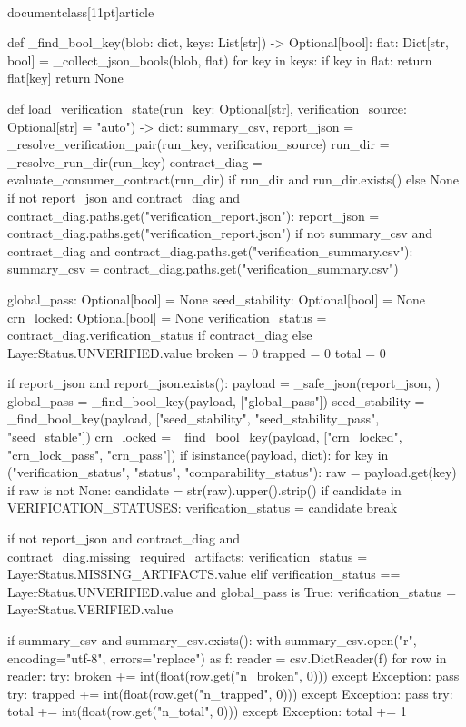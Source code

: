 \\documentclass[11pt]{article}
\begin{document}
\begin{CodeBlock}
{def _find_bool_key(blob: dict, keys: List[str]) -> Optional[bool]:
    flat: Dict[str, bool] = {}
    _collect_json_bools(blob, flat)
    for key in keys:
        if key in flat:
            return flat[key]
    return None


def load_verification_state(run_key: Optional[str], verification_source: Optional[str] = "auto") -> dict:
    summary_csv, report_json = _resolve_verification_pair(run_key, verification_source)
    run_dir = _resolve_run_dir(run_key)
    contract_diag = evaluate_consumer_contract(run_dir) if run_dir and run_dir.exists() else None
    if not report_json and contract_diag and contract_diag.paths.get("verification_report.json"):
        report_json = contract_diag.paths.get("verification_report.json")
    if not summary_csv and contract_diag and contract_diag.paths.get("verification_summary.csv"):
        summary_csv = contract_diag.paths.get("verification_summary.csv")

    global_pass: Optional[bool] = None
    seed_stability: Optional[bool] = None
    crn_locked: Optional[bool] = None
    verification_status = contract_diag.verification_status if contract_diag else LayerStatus.UNVERIFIED.value
    broken = 0
    trapped = 0
    total = 0

    if report_json and report_json.exists():
        payload = _safe_json(report_json, {})
        global_pass = _find_bool_key(payload, ["global_pass"])
        seed_stability = _find_bool_key(payload, ["seed_stability", "seed_stability_pass", "seed_stable"])
        crn_locked = _find_bool_key(payload, ["crn_locked", "crn_lock_pass", "crn_pass"])
        if isinstance(payload, dict):
            for key in ("verification_status", "status", "comparability_status"):
                raw = payload.get(key)
                if raw is not None:
                    candidate = str(raw).upper().strip()
                    if candidate in VERIFICATION_STATUSES:
                        verification_status = candidate
                        break

    if not report_json and contract_diag and contract_diag.missing_required_artifacts:
        verification_status = LayerStatus.MISSING_ARTIFACTS.value
    elif verification_status == LayerStatus.UNVERIFIED.value and global_pass is True:
        verification_status = LayerStatus.VERIFIED.value

    if summary_csv and summary_csv.exists():
        with summary_csv.open("r", encoding="utf-8", errors="replace") as f:
            reader = csv.DictReader(f)
            for row in reader:
                try:
                    broken += int(float(row.get("n_broken", 0)))
                except Exception:
                    pass
                try:
                    trapped += int(float(row.get("n_trapped", 0)))
                except Exception:
                    pass
                try:
                    total += int(float(row.get("n_total", 0)))
                except Exception:
                    total += 1

}
\end{CodeBlock}
\end{document}
